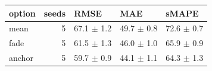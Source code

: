 \begin{tabular}{lrlll}
\toprule
option & seeds & RMSE & MAE & sMAPE \\
\midrule
mean & 5 & 67.1 $\pm$ 1.2 & 49.7 $\pm$ 0.8 & 72.6 $\pm$ 0.7 \\
fade & 5 & 61.5 $\pm$ 1.3 & 46.0 $\pm$ 1.0 & 65.9 $\pm$ 0.9 \\
anchor & 5 & 59.7 $\pm$ 0.9 & 44.1 $\pm$ 1.1 & 64.3 $\pm$ 1.3 \\
\bottomrule
\end{tabular}
